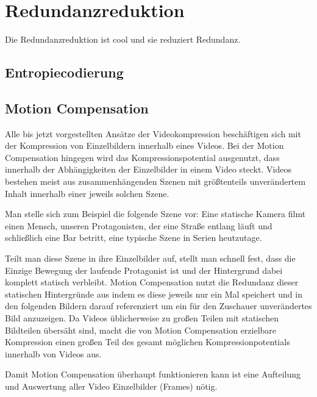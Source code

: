 \chapter{Redundanzreduktion}
\label{kap:Redundanzreduktion}

Die Redundanzreduktion ist cool und sie reduziert Redundanz.

\section{Entropiecodierung}

\section{Motion Compensation}

Alle bis jetzt vorgestellten Ansätze der Videokompression beschäftigen sich mit der Kompression von Einzelbildern innerhalb eines Videos. Bei der Motion Compensation hingegen wird das Kompressionspotential ausgenutzt, dass innerhalb der Abhängigkeiten der Einzelbilder in einem Video steckt.
Videos bestehen meist aus zusammenhängenden Szenen mit größtenteils unverändertem Inhalt innerhalb einer jeweils solchen Szene.

Man stelle sich zum Beispiel die folgende Szene vor: Eine statische Kamera filmt einen Mensch, unseren Protagonisten, der eine Straße entlang läuft und schließlich eine Bar betritt, eine typische Szene in Serien heutzutage.

Teilt man diese Szene in ihre Einzelbilder auf, stellt man schnell fest, dass die Einzige Bewegung der laufende Protagonist ist und der Hintergrund dabei komplett statisch verbleibt.
Motion Compensation nutzt die Redundanz dieser statischen Hintergründe aus indem es diese jeweils nur ein Mal speichert und in den folgenden Bildern darauf referenziert um ein für den Zuschauer unverändertes Bild anzuzeigen.
Da Videos üblicherweise zu großen Teilen mit statischen Bildteilen übersäht sind, macht die von Motion Compensation erzielbare Kompression einen großen Teil des gesamt möglichen Kompressionpotentials innerhalb von Videos aus.

Damit Motion Compensation überhaupt funktionieren kann ist eine Aufteilung und Auswertung aller Video Einzelbilder (Frames) nötig.
